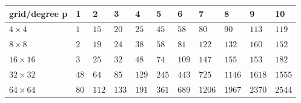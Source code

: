 \begin{tabular}{lllllllllll}
\hline
 grid/degree p   & 1    & 2     & 3     & 4     & 5     & 6     & 7      & 8      & 9      & 10     \\
\hline
 $4 \times 4$    & $1$  & $15$  & $20$  & $25$  & $45$  & $58$  & $80$   & $90$   & $113$  & $119$  \\
 $8 \times 8$    & $2$  & $19$  & $24$  & $38$  & $58$  & $81$  & $122$  & $132$  & $160$  & $152$  \\
 $16 \times 16$  & $3$  & $25$  & $32$  & $48$  & $74$  & $109$ & $147$  & $155$  & $153$  & $182$  \\
 $32 \times 32$  & $48$ & $64$  & $85$  & $129$ & $245$ & $443$ & $725$  & $1146$ & $1618$ & $1555$ \\
 $64 \times 64$  & $80$ & $112$ & $133$ & $191$ & $361$ & $689$ & $1206$ & $1967$ & $2370$ & $2544$ \\
\hline
\end{tabular}